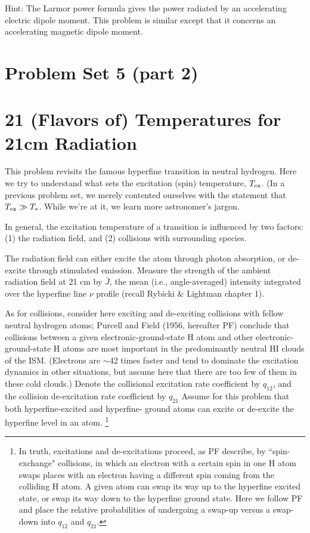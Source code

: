 \documentclass[11pt]{article}
\begin{document}
Hint: The Larmor power formula gives the power radiated by an accelerating
electric dipole moment. This problem is similar except that it concerns an
accelerating magnetic dipole moment.

\section*{\centering Problem Set 5 (part 2)}

\def\Tex{{T_{\rm ex}}}
\def\Jbar{{\bar J}}
\def\qot{{q_{12}}}
\def\qto{{q_{21}}}
\def\Ato{{A_{21}}}
\section{21 (Flavors of) Temperatures for 21cm Radiation}

This problem revisits the famous hyperfine transition in neutral hydrogen. Here
we try to understand what sets the excitation (spin) temperature, $\Tex$. (In a
previous problem set, we merely contented ourselves with the statement that 
$\Tex\gg T_*$.  While we're at it, we learn more astronomer's jargon.

In general, the excitation temperature of a transition is influenced by two
factors: (1) the radiation field, and (2) collisions with surrounding species.

The radiation field can either excite the atom through photon absorption, or
de-excite through stimulated emission. Measure the strength of the ambient
radiation field at 21 cm by $\Jbar$, the mean (i.e., angle-averaged) intensity
integrated over the hyperfine line $\nu$ profile (recall Rybicki \& Lightman chapter
1).

As for collisions, consider here exciting and de-exciting collisions with
fellow neutral hydrogen atoms; Purcell and Field (1956, hereafter PF) conclude
that collisions between a given electronic-ground-state H atom and other
electronic-ground-state H atoms are most important in the predominantly neutral
HI clouds of the ISM. (Electrons are $\sim$42 times faster and tend to dominate
the excitation dynamics in other situations, but assume here that there are too
few of them in these cold clouds.) Denote the collisional excitation rate
coefficient by $\qot$, and the collision de-excitation rate coefficient by
$\qto$ Assume for this problem that both hyperfine-excited and hyperfine-
ground atoms can excite or de-excite the hyperfine level in an atom.
\footnote{ In truth, excitations and de-excitations proceed, as PF describe, by
``spin-exchange" collisions, in which an electron with a certain spin in one H
atom swaps places with an electron having a different spin coming from the
colliding H atom. A given atom can swap its way up to the hyperfine excited
state, or swap its way down to the hyperfine ground state. Here we follow PF
and place the relative probabilities of undergoing a swap-up versus a swap-down
into $\qot$ and $\qto$.}
\end{document}
